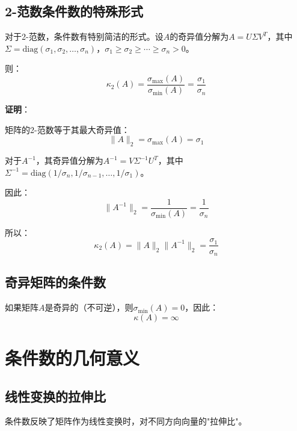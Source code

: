 \documentclass[12pt,a4paper]{article}
\begin{document}
\subsection{2-范数条件数的特殊形式}

对于2-范数，条件数有特别简洁的形式。设$A$的奇异值分解为$A = U\Sigma V^T$，其中$\Sigma = \text{diag}(\sigma_1, \sigma_2, \ldots, \sigma_n)$，$\sigma_1 \geq \sigma_2 \geq \cdots \geq \sigma_n > 0$。

则：
\begin{equation}
\kappa_2(A) = \frac{\sigma_{\max}(A)}{\sigma_{\min}(A)} = \frac{\sigma_1}{\sigma_n}
\label{eq:condition_number_svd}
\end{equation}

\textbf{证明}：

矩阵的2-范数等于其最大奇异值：
\begin{equation}
\|A\|_2 = \sigma_{\max}(A) = \sigma_1
\end{equation}

对于$A^{-1}$，其奇异值分解为$A^{-1} = V\Sigma^{-1} U^T$，其中$\Sigma^{-1} = \text{diag}(1/\sigma_n, 1/\sigma_{n-1}, \ldots, 1/\sigma_1)$。

因此：
\begin{equation}
\|A^{-1}\|_2 = \frac{1}{\sigma_{\min}(A)} = \frac{1}{\sigma_n}
\end{equation}

所以：
\begin{equation}
\kappa_2(A) = \|A\|_2 \|A^{-1}\|_2 = \frac{\sigma_1}{\sigma_n}
\end{equation}

\subsection{奇异矩阵的条件数}

如果矩阵$A$是奇异的（不可逆），则$\sigma_{\min}(A) = 0$，因此：
\begin{equation}
\kappa(A) = \infty
\end{equation}

\section{条件数的几何意义}

\subsection{线性变换的拉伸比}

条件数反映了矩阵作为线性变换时，对不同方向向量的"拉伸比"。
\end{document}
